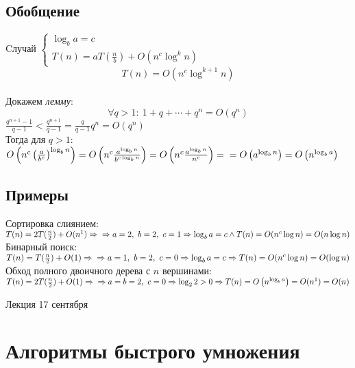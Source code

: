 \documentclass[12pt, a4paper]{article}
\begin{document}
    \subsection*{Обобщение}
    Cлучай $\begin{cases} 
        \log_b a = c\\
        T(n) = aT(\frac{n}{b}) + O(n^c\log^k n)
    \end{cases}$
    \[T(n) = O(n^c\log^{k + 1} n)\]\\
    Докажем \textit{лемму}:
    \[\forall q > 1:\ 1 + q + \cdots + q^n = O(q^n)\]
    $\frac{q^{n + 1} - 1}{q - 1} < \frac{q^{n + 1}}{q - 1} = \frac{q}{q - 1}q^n = O(q^n)$\\
    Тогда для $q > 1$: $O\left(n^c \left( \frac{a}{b^c} \right)^{\log_b n} \right) = O\left( n^c \frac{a^{\log_b n}}{b^{c\log_b n}} \right) = O\left( n^c \frac{a^{\log_b n}}{n^c} \right) =\\
    = O\left( a^{\log_b n} \right) = O\left( n^{\log_b a} \right)$
    \subsection*{Примеры}
    Сортировка слиянием:\\
    $T(n) = 2T(\frac{n}{2}) + O(n^1)\Rightarrow\\
    \Rightarrow a = 2,\ b = 2,\ c = 1\Rightarrow \log_b a = c \wedge T(n) = O(n^c\log n) = O(n\log n)$\\
    Бинарный поиск:\\
    $T(n) = T(\frac{n}{2}) + O(1)\Rightarrow\\
    \Rightarrow a = 1,\ b = 2,\ c = 0\Rightarrow \log_b a = c\Rightarrow T(n) = O(n^c\log n) = O(\log n)$\\
    Обход полного двоичного дерева с $n$ вершинами:\\
    $T(n) = 2T(\frac{n}{2}) + O(1)\Rightarrow\\
    \Rightarrow a = b = 2,\ c = 0\Rightarrow \log_2 2 > 0\Rightarrow T(n) = O\left(n^{\log_b a}\right) = O(n^1) = O(n)$
    \begin{center}
        Лекция 17 сентября
    \end{center}
    \section{Алгоритмы быстрого умножения}
\end{document}
